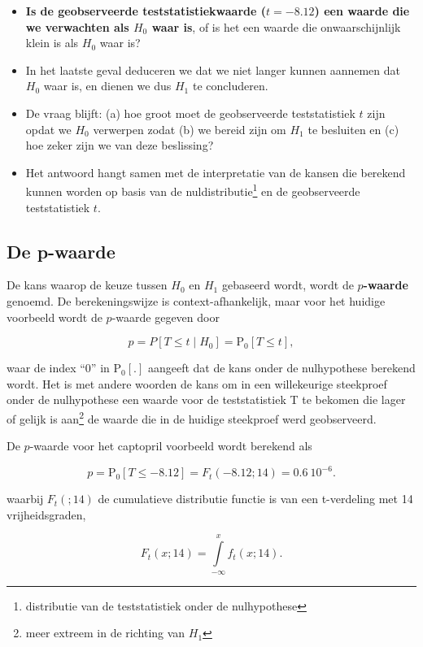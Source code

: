 \documentclass[
  12pt,dutch,coursenotes]{book}
\providecommand{\tightlist}{%
  \setlength{\itemsep}{0pt}\setlength{\parskip}{0pt}}
\theoremstyle{definition}
\theoremstyle{definition}
\theoremstyle{definition}
\theoremstyle{remark}
\begin{document}
\begin{itemize}
\tightlist
\item
  \textbf{Is de geobserveerde teststatistiekwaarde (\(t=-8.12\)) een waarde die we verwachten als \(H_0\) waar is}, of is het een waarde die onwaarschijnlijk klein is als \(H_0\) waar is?
\item
  In het laatste geval deduceren we dat we niet langer kunnen aannemen dat \(H_0\) waar is, en dienen we dus \(H_1\) te concluderen.
\item
  De vraag blijft: (a) hoe groot moet de geobserveerde teststatistiek \(t\) zijn opdat we \(H_0\) verwerpen zodat (b) we bereid zijn om \(H_1\) te besluiten en (c) hoe zeker zijn we van deze beslissing?
\item
  Het antwoord hangt samen met de interpretatie van de kansen die berekend kunnen worden op basis van de nuldistributie\footnote{distributie van de teststatistiek onder de nulhypothese} en de geobserveerde teststatistiek \(t\).
\end{itemize}

\hypertarget{de-p-waarde}{%
\subsection{De p-waarde}\label{de-p-waarde}}

De kans waarop de keuze tussen \(H_0\) en \(H_1\) gebaseerd wordt, wordt de \textbf{\(p\)-waarde} genoemd. De berekeningswijze is context-afhankelijk, maar voor het huidige voorbeeld wordt de \(p\)-waarde gegeven door

\[
    p = P\left[T \leq t \mid H_0\right] = \text{P}_0\left[T\leq t\right],
  \]

waar de index ``0'' in \(\text{P}_0\left[.\right]\) aangeeft dat de kans onder de nulhypothese berekend wordt. Het is met andere woorden de kans om in een willekeurige steekproef onder de nulhypothese een waarde voor de teststatistiek T te bekomen die lager of gelijk is aan\footnote{meer extreem in de richting van \(H_1\)} de waarde die in de huidige steekproef werd geobserveerd.

De \(p\)-waarde voor het captopril voorbeeld wordt berekend als

\[p= \text{P}_0\left[T\leq -8.12\right]=F_t(-8.12;14) = 0.6\ 10^{-6}.\]

waarbij \(F_t(;14)\) de cumulatieve distributie functie is van een t-verdeling met 14 vrijheidsgraden,

\[F_t(x;14)=\int\limits_{-\infty}^{x} f_t(x;14).\]
\end{document}
